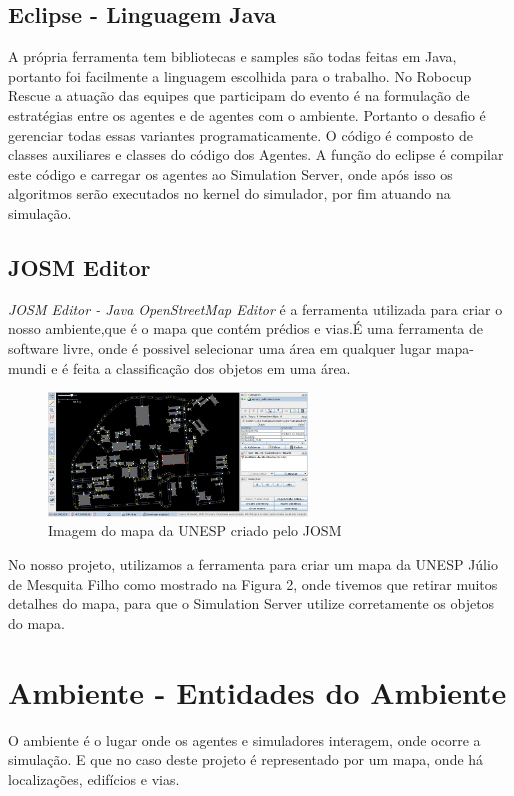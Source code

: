 \documentclass[conference]{IEEEtran}
\begin{document}
\subsection{Eclipse - Linguagem Java}
A própria ferramenta tem bibliotecas e samples são todas feitas em Java, portanto foi facilmente a linguagem escolhida para o trabalho. No Robocup Rescue a atuação das equipes que participam do evento é na formulação de estratégias entre os agentes e de agentes com o ambiente. Portanto o desafio é gerenciar todas essas variantes programaticamente. 
O código é composto de classes auxiliares e classes do código dos Agentes. A função do eclipse é compilar este código e carregar os agentes ao Simulation Server, onde após isso os algoritmos serão executados no kernel do simulador, por fim atuando na simulação.

\subsection{JOSM Editor}
\textit {JOSM Editor - Java OpenStreetMap Editor} é a ferramenta utilizada para criar o nosso ambiente,que é o mapa que contém prédios e vias.É uma ferramenta de software livre, onde é possivel selecionar uma área em qualquer lugar mapa-mundi e é feita a classificação dos objetos em uma área.

\begin{figure}[htbp]
\centerline{\includegraphics[height=3.3cm]{fig3.jpeg}}
\caption{Imagem do mapa da UNESP criado pelo JOSM \cite{b2}}
\label{fig}
\end{figure}

No nosso projeto, utilizamos a ferramenta para criar um mapa da UNESP Júlio de Mesquita Filho como mostrado na Figura 2, onde tivemos que retirar muitos detalhes do mapa, para que o Simulation Server utilize corretamente os objetos do mapa.

\section{Ambiente - Entidades do Ambiente}
O ambiente é o lugar onde os agentes e simuladores interagem, onde ocorre a simulação. E que no caso deste projeto é representado por um mapa, onde há localizações, edifícios e vias.
\end{document}

